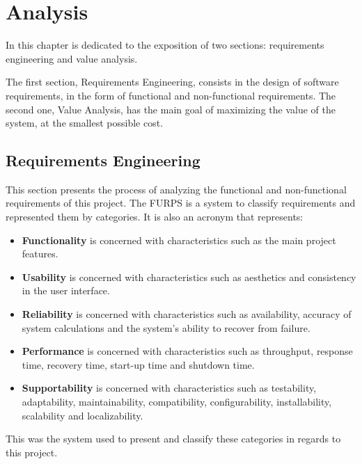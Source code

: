 
\chapter{Analysis} %
\label{chap:Chapter3} %

In this chapter is dedicated to the exposition of two sections: requirements engineering and value analysis.

The first section, Requirements Engineering, consists in the design of software requirements, in the form of functional and non-functional requirements.
The second one, Value Analysis, has the main goal of maximizing the value of the system, at the smallest possible cost.

\section{Requirements Engineering}

This section presents the process of analyzing the functional and non-functional requirements of this project.
The FURPS\cite{eeles2005capturing} is a system to classify requirements and represented them by categories.
It is also an acronym that represents:

\begin{itemize}
    \item \textbf{Functionality} is concerned with characteristics such as the main project features.
    \item \textbf{Usability} is concerned with characteristics such as aesthetics and consistency in the user interface.
    \item \textbf{Reliability} is concerned with characteristics such as availability, accuracy of system calculations and the system's ability to recover from failure.
    \item \textbf{Performance} is concerned with characteristics such as throughput, response time, recovery time, start-up time and shutdown time.
    \item \textbf{Supportability} is concerned with characteristics such as testability, adaptability, maintainability, compatibility, configurability, installability, scalability and localizability.
\end{itemize}

This was the system used to present and classify these categories in regards to this project.

